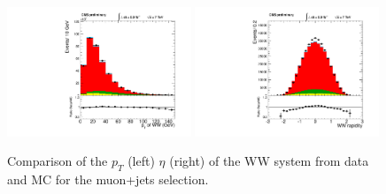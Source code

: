 
\begin{figure}[h!t]
  {\centering
    \includegraphics[width=0.49\textwidth]{plots/2012_DataMC/mu_ptlvjj.pdf}
    \includegraphics[width=0.49\textwidth]{plots/2012_DataMC/mu_etalvjj.pdf}
    \caption{Comparison of the $p_{T}$ (left) $\eta$ (right) of the WW system
      from data and MC for the muon+jets selection.}
\label{fig:mu_ww}}
\end{figure}


